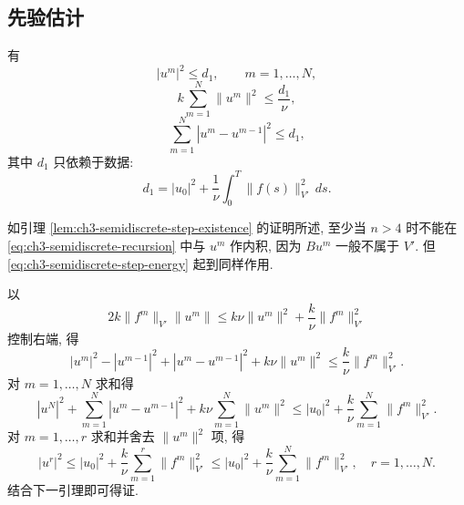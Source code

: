\subsection{先验估计}
\label{subsec:ch3-semidiscrete-estimates}
\begin{Lemma}
\label{lem:ch3-semidiscrete-discrete-estimates}
有
\begin{equation}
|u^m|^2\leq d_1,
\qquad m=1,\ldots,N,
\label{eq:ch3-semidiscrete-um-bound}
\end{equation}
\begin{equation}
k\sum_{m=1}^N\lVert u^m\rVert^2\leq\frac{d_1}\nu,
\label{eq:ch3-semidiscrete-v-sum-bound}
\end{equation}
\begin{equation}
\sum_{m=1}^N|u^m-u^{m-1}|^2\leq d_1,
\label{eq:ch3-semidiscrete-increment-bound}
\end{equation}
其中 $d_1$ 只依赖于数据:
\begin{equation}
d_1=|u_0|^2+\frac1\nu\int_0^T\lVert f(s)\rVert_{V'}^2\,ds.
\label{eq:ch3-semidiscrete-d1}
\end{equation}
\end{Lemma}

\begin{Proof}
如引理 \ref{lem:ch3-semidiscrete-step-existence} 的证明所述, 至少当 $n>4$ 时不能在 \eqref{eq:ch3-semidiscrete-recursion} 中与 $u^m$ 作内积, 因为 $Bu^m$ 一般不属于 $V'$. 但 \eqref{eq:ch3-semidiscrete-step-energy} 起到同样作用.

\hypertarget{chapter-03-page-236}{}
以
\[
2k\lVert f^m\rVert_{V'}\lVert u^m\rVert
\leq k\nu\lVert u^m\rVert^2+\frac k\nu\lVert f^m\rVert_{V'}^2
\]
控制右端, 得
\begin{equation}
|u^m|^2-|u^{m-1}|^2+|u^m-u^{m-1}|^2+k\nu\lVert u^m\rVert^2
\leq\frac k\nu\lVert f^m\rVert_{V'}^2.
\label{eq:ch3-semidiscrete-step-energy-reduced}
\end{equation}
对 $m=1,\ldots,N$ 求和得
\begin{equation}
|u^N|^2+\sum_{m=1}^N|u^m-u^{m-1}|^2
+k\nu\sum_{m=1}^N\lVert u^m\rVert^2
\leq|u_0|^2+\frac k\nu\sum_{m=1}^N\lVert f^m\rVert_{V'}^2.
\label{eq:ch3-semidiscrete-global-energy}
\end{equation}
对 $m=1,\ldots,r$ 求和并舍去 $\lVert u^m\rVert^2$ 项, 得
\begin{equation}
|u^r|^2\leq|u_0|^2+\frac k\nu\sum_{m=1}^r\lVert f^m\rVert_{V'}^2
\leq|u_0|^2+\frac k\nu\sum_{m=1}^N\lVert f^m\rVert_{V'}^2,
\quad r=1,\ldots,N.
\label{eq:ch3-semidiscrete-partial-energy}
\end{equation}
结合下一引理即可得证.
\end{Proof}

